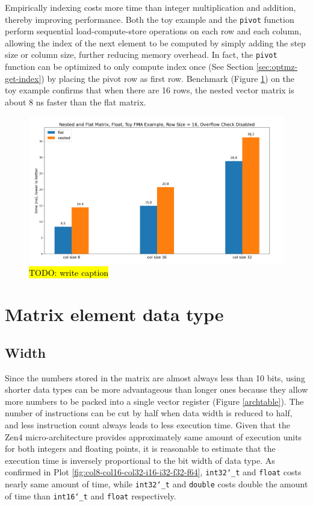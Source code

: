 \documentclass[logo,bsc,singlespacing,parskip]{infthesis}
\newcommand{\dtshort}{\texttt{int16\char`_t}}
\newcommand{\dtint}{\texttt{int32\char`_t}}
\newcommand{\dtfloat}{\texttt{float}}
\newcommand{\dtdouble}{\texttt{double}}
\newcommand{\pivot}{\texttt{pivot}}
\begin{document}
Empirically indexing costs more time than integer multiplication and addition,
thereby improving performance. Both the toy example and the \pivot{} function
perform sequential load-compute-store operations on each row and each column,
allowing the index of the next element to be computed by simply adding the step
size or column size, further reducing memory overhead. In fact, the \pivot{}
function can be optimized to only compute index once (See Section
\ref{sec:optmz-get-index}) by placing the pivot row as first row. Benchmark
(Figure \ref{fig:nested-flat}) on the toy example confirms that when there are
16 rows, the nested vector matrix is about 8 ns faster than the flat matrix.

\begin{figure}
    \includegraphics[width=\linewidth]{image/nested-flat.jpg}
    \caption{\hl{TODO: write caption}}
    \label{fig:nested-flat}
\end{figure}


\section{Matrix element data type}


\subsection{Width}
\label{sec:width} 
Since the numbers stored in the matrix are almost always less than 10 bits,
using shorter data types can be more advantageous than longer ones because they
allow more numbers to be packed into a single vector register (Figure 
\ref{archtable}). The number of instructions can be cut by half when data width
is reduced to half, and less instruction count always leads to less execution
time. Given that the Zen4 micro-architecture provides approximately same amount
of execution units for both integers and floating points, it is reasonable to
estimate that the execution time is inversely proportional to the bit width of
data type. As confirmed in Plot \ref{fig:col8-col16-col32-i16-i32-f32-f64},
\dtint{} and \dtfloat{} costs nearly same amount of time, while \dtint{} and \dtdouble{}
costs double the amount of time than \dtshort{} and \dtfloat{} respectively.
\end{document}
